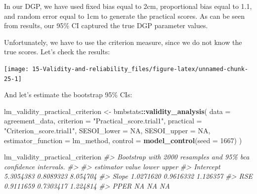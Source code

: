 \documentclass[
]{book}
\newenvironment{Shaded}{\begin{snugshade}}{\end{snugshade}}
\newcommand{\CommentTok}[1]{\textcolor[rgb]{0.56,0.35,0.01}{\textit{#1}}}
\newcommand{\DataTypeTok}[1]{\textcolor[rgb]{0.13,0.29,0.53}{#1}}
\newcommand{\DecValTok}[1]{\textcolor[rgb]{0.00,0.00,0.81}{#1}}
\newcommand{\KeywordTok}[1]{\textcolor[rgb]{0.13,0.29,0.53}{\textbf{#1}}}
\newcommand{\NormalTok}[1]{#1}
\newcommand{\OperatorTok}[1]{\textcolor[rgb]{0.81,0.36,0.00}{\textbf{#1}}}
\newcommand{\OtherTok}[1]{\textcolor[rgb]{0.56,0.35,0.01}{#1}}
\newcommand{\StringTok}[1]{\textcolor[rgb]{0.31,0.60,0.02}{#1}}
\begin{document}
In our DGP, we have used fixed bias equal to 2cm, proportional bias equal to 1.1, and random error equal to 1cm to generate the practical scores. As can be seen from results, our 95\% CI captured the true DGP parameter values.

Unfortunately, we have to use the criterion measure, since we do not know the true scores. Let's check the results:

\begin{Shaded}
\end{Shaded}

\begin{center}\texttt{[image: 15-Validity-and-reliability\_files/figure-latex/unnamed-chunk-25-1]} \end{center}

And let's estimate the bootstrap 95\% CIs:

\begin{Shaded}
\begin{Highlighting}[]
\NormalTok{lm\_validity\_practical\_criterion <{-}}\StringTok{ }\NormalTok{bmbstats}\OperatorTok{::}\KeywordTok{validity\_analysis}\NormalTok{(}
  \DataTypeTok{data =}\NormalTok{ agreement\_data,}
  \DataTypeTok{criterion =} \StringTok{"Practical\_score.trial1"}\NormalTok{,}
  \DataTypeTok{practical =} \StringTok{"Criterion\_score.trial1"}\NormalTok{,}
  \DataTypeTok{SESOI\_lower =} \OtherTok{NA}\NormalTok{,}
  \DataTypeTok{SESOI\_upper =} \OtherTok{NA}\NormalTok{,}
  \DataTypeTok{estimator\_function =}\NormalTok{ lm\_method,}
  \DataTypeTok{control =} \KeywordTok{model\_control}\NormalTok{(}\DataTypeTok{seed =} \DecValTok{1667}\NormalTok{)}
\NormalTok{)}

\NormalTok{lm\_validity\_practical\_criterion}
\CommentTok{\#> Bootstrap with 2000 resamples and 95\% bca confidence intervals.}
\CommentTok{\#> }
\CommentTok{\#>  estimator     value     lower    upper}
\CommentTok{\#>  Intercept 5.3054383 0.8089323 8.054704}
\CommentTok{\#>      Slope 1.0271620 0.9616332 1.126357}
\CommentTok{\#>        RSE 0.9111659 0.7303417 1.224814}
\CommentTok{\#>       PPER        NA        NA       NA}
\end{Highlighting}
\end{Shaded}
\end{document}
